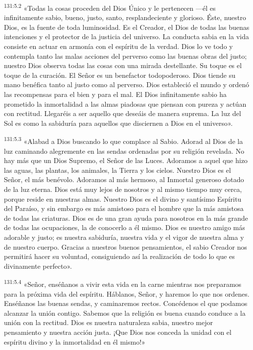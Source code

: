 \par
\textsuperscript{131:5.2} «Todas la cosas proceden del Dios Único y le pertenecen ---él es infinitamente sabio, bueno, justo, santo, resplandeciente y glorioso. Éste, nuestro Dios, es la fuente de toda luminosidad. Es el Creador, el Dios de todas las buenas intenciones y el protector de la justicia del universo. La conducta sabia en la vida consiste en actuar en armonía con el espíritu de la verdad. Dios lo ve todo y contempla tanto las malas acciones del perverso como las buenas obras del justo; nuestro Dios observa todas las cosas con una mirada destellante. Su toque es el toque de la curación. El Señor es un benefactor todopoderoso. Dios tiende su mano benéfica tanto al justo como al perverso. Dios estableció el mundo y ordenó las recompensas para el bien y para el mal. El Dios infinitamente sabio ha prometido la inmortalidad a las almas piadosas que piensan con pureza y actúan con rectitud. Llegaréis a ser aquello que deseáis de manera suprema. La luz del Sol es como la sabiduría para aquellos que disciernen a Dios en el universo».

\par
\textsuperscript{131:5.3} «Alabad a Dios buscando lo que complace al Sabio. Adorad al Dios de la luz caminando alegremente en las sendas ordenadas por su religión revelada. No hay más que un Dios Supremo, el Señor de las Luces. Adoramos a aquel que hizo las aguas, las plantas, los animales, la Tierra y los cielos. Nuestro Dios es el Señor, el más benévolo. Adoramos al más hermoso, al Inmortal generoso dotado de la luz eterna. Dios está muy lejos de nosotros y al mismo tiempo muy cerca, porque reside en nuestras almas. Nuestro Dios es el divino y santísimo Espíritu del Paraíso, y sin embargo es más amistoso para el hombre que la más amistosa de todas las criaturas. Dios es de una gran ayuda para nosotros en la más grande de todas las ocupaciones, la de conocerlo a él mismo. Dios es nuestro amigo más adorable y justo; es nuestra sabiduría, nuestra vida y el vigor de nuestra alma y de nuestro cuerpo. Gracias a nuestros buenos pensamientos, el sabio Creador nos permitirá hacer su voluntad, consiguiendo así la realización de todo lo que es divinamente perfecto».

\par
\textsuperscript{131:5.4} «Señor, enséñanos a vivir esta vida en la carne mientras nos preparamos para la próxima vida del espíritu. Háblanos, Señor, y haremos lo que nos ordenes. Enséñanos las buenas sendas, y caminaremos rectos. Concédenos el que podamos alcanzar la unión contigo. Sabemos que la religión es buena cuando conduce a la unión con la rectitud. Dios es nuestra naturaleza sabia, nuestro mejor pensamiento y nuestra acción justa. ¡Que Dios nos conceda la unidad con el espíritu divino y la inmortalidad en él mismo!»

